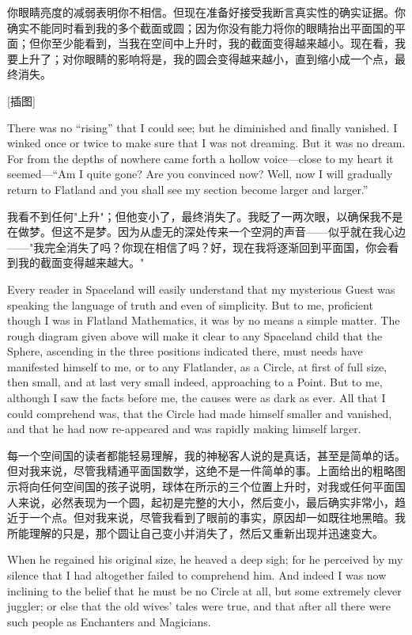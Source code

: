 \documentclass[12pt,UTF8]{ctexbook}
\begin{document}
你眼睛亮度的减弱表明你不相信。但现在准备好接受我断言真实性的确实证据。你确实不能同时看到我的多个截面或圆；因为你没有能力将你的眼睛抬出平面国的平面；但你至少能看到，当我在空间中上升时，我的截面变得越来越小。现在看，我要上升了；对你眼睛的影响将是，我的圆会变得越来越小，直到缩小成一个点，最终消失。

[插图]

There was no ``rising'' that I could see; but he diminished and finally vanished. I winked once or twice to make sure that I was not dreaming. But it was no dream. For from the depths of nowhere came forth a hollow voice---close to my heart it seemed---``Am I quite gone? Are you convinced now? Well, now I will gradually return to Flatland and you shall see my section become larger and larger.''

我看不到任何"上升"；但他变小了，最终消失了。我眨了一两次眼，以确保我不是在做梦。但这不是梦。因为从虚无的深处传来一个空洞的声音——似乎就在我心边——"我完全消失了吗？你现在相信了吗？好，现在我将逐渐回到平面国，你会看到我的截面变得越来越大。"

Every reader in Spaceland will easily understand that my mysterious Guest was speaking the language of truth and even of simplicity. But to me, proficient though I was in Flatland Mathematics, it was by no means a simple matter. The rough diagram given above will make it clear to any Spaceland child that the Sphere, ascending in the three positions indicated there, must needs have manifested himself to me, or to any Flatlander, as a Circle, at first of full size, then small, and at last very small indeed, approaching to a Point. But to me, although I saw the facts before me, the causes were as dark as ever. All that I could comprehend was, that the Circle had made himself smaller and vanished, and that he had now re-appeared and was rapidly making himself larger.

每一个空间国的读者都能轻易理解，我的神秘客人说的是真话，甚至是简单的话。但对我来说，尽管我精通平面国数学，这绝不是一件简单的事。上面给出的粗略图示将向任何空间国的孩子说明，球体在所示的三个位置上升时，对我或任何平面国人来说，必然表现为一个圆，起初是完整的大小，然后变小，最后确实非常小，趋近于一个点。但对我来说，尽管我看到了眼前的事实，原因却一如既往地黑暗。我所能理解的只是，那个圆让自己变小并消失了，然后又重新出现并迅速变大。

When he regained his original size, he heaved a deep sigh; for he perceived by my silence that I had altogether failed to comprehend him. And indeed I was now inclining to the belief that he must be no Circle at all, but some extremely clever juggler; or else that the old wives' tales were true, and that after all there were such people as Enchanters and Magicians.
\end{document}
